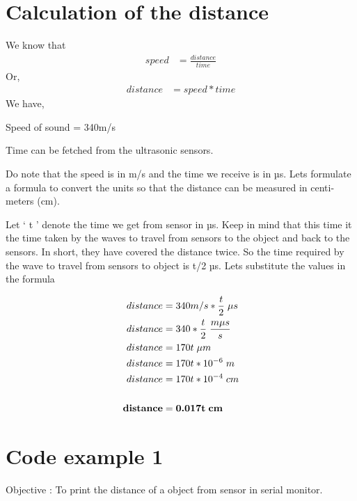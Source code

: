 \section{Calculation of the distance}
We know that 
\begin{align*}
    speed &= \frac{distance}{time}
\end{align*}
Or,
\begin{align*}
    distance &= speed * time
\end{align*}  
We have,
\par Speed of sound = 340m/s
\par Time can be fetched from the ultrasonic sensors.

\vspace{0.5cm}
\par Do note that the speed is in m/s and the time we receive is in µs. Lets formulate a formula to convert the units so that the distance can be measured in centi-meters (cm).

\par Let ‘ t ’ denote the time we get from sensor in µs. Keep in mind that this time it the time taken by the waves to travel from sensors to the object and back to the sensors. In short, they have covered the distance twice. So the time required by the wave to travel from sensors to object is t/2 µs. Lets substitute the values in the formula

\begin{align*}
    distance &= 340 m/s * \frac{t}{2} \hspace{0.1cm} \mu s \\
    distance &= 340 * \frac{t}{2} \hspace{0.1cm} \frac{m \mu s}{s} \\
    distance &= 170t\hspace{0.1cm} \mu m \\
    distance &= 170t * 10^{-6} \hspace{0.1cm} m \\
    distance &= 170t * 10^{-4} \hspace{0.1cm} cm \\
    \vspace{0.3cm}\\
    \textbf{distance} &= \textbf{0.017t} \hspace{0.1cm} \textbf{cm}
\end{align*}


\section{\textbf{Code example 1}}
\par Objective : To print the distance of a object from sensor in serial monitor.

